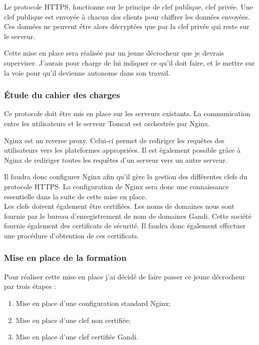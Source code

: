 Le protocole HTTPS, fonctionne sur le principe de clef publique, clef privée. Une clef publique est envoyée à chacun des clients pour chiffrer les données envoyées. Ces données ne peuvent être alors décryptées que par la clef privée qui reste sur le serveur.

Cette mise en place sera réalisée par un jeune décrocheur que je devrais superviser. J'aurais pour charge de lui indiquer ce qu'il doit faire, et le mettre sur la voie pour qu'il devienne autonome dans son travail.

\subsubsection{Étude du cahier des charges}

Ce protocole doit être mis en place sur les serveurs existants. La communication entre les utilisateurs et le serveur Tomcat est orchestrée par Nginx.

Nginx est un reverse proxy. Celui-ci permet de rediriger les requêtes des utilisateurs vers les plateformes appropriées. Il est également possible grâce à Nginx de rediriger toutes les requêtes d'un serveur vers un autre serveur.

Il faudra donc configurer Nginx afin qu'il gère la gestion des différentes clefs du protocole HTTPS. La configuration de Nginx sera donc une connaissance essentielle dans la suite de cette mise en place.\\

Les clefs doivent également être certifiées. Les noms de domaines nous sont fournie par le bureau d'enregistrement de nom de domaines Gandi. Cette société fournie également des certificats de sécurité. Il faudra donc également effectuer une procédure d'obtention de ces certificats.

\subsubsection{Mise en place de la formation}

Pour réaliser cette mise en place j'ai décidé de faire passer ce jeune décrocheur par trois étapes :

\begin{enumerate}
	\item Mise en place d'une configuration standard Nginx;
	\item Mise en place d'une clef non certifiée;
	\item Mise en place d'une clef certifiée Gandi.
\end{enumerate}

